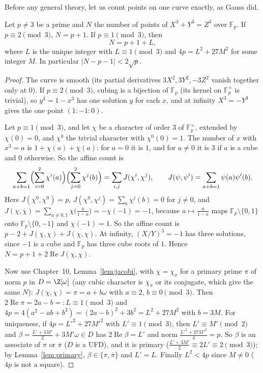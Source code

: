 Before any general theory, let us count points on one curve exactly, as Gauss did.

\begin{proposition}[Gauss]\label{prop:gausscubic}
Let $p\ne3$ be a prime and $N$ the number of points of $X^3+Y^3=Z^3$ over $\mathbb F_p$. If $p\equiv2\pmod3$, $N=p+1$. If $p\equiv1\pmod3$, then
\[
N=p+1+L,
\]
where $L$ is the unique integer with $L\equiv1\pmod3$ and $4p=L^2+27M^2$ for some integer $M$. In particular $|N-p-1|<2\sqrt p$.
\end{proposition}
\begin{proof}
The curve is smooth (its partial derivatives $3X^2,3Y^2,-3Z^2$ vanish together only at $0$). If $p\equiv2\pmod3$, cubing is a bijection of $\mathbb F_p$
(its kernel on $\mathbb F_p^\times$ is trivial), so $y^3=1-x^3$ has one solution $y$ for each $x$, and at infinity $X^3=-Y^3$ gives the one point $(1:-1:0)$.

Let $p\equiv1\pmod3$, and let $\chi$ be a character of order $3$ of $\mathbb F_p^\times$, extended by $\chi(0)=0$, and $\chi^0$ the trivial character with
$\chi^0(0)=1$. The number of $x$ with $x^3=a$ is $1+\chi(a)+\overline\chi(a)$: for $a=0$ it is $1$, and for $a\ne0$ it is $3$ if $a$ is a cube and $0$ otherwise.
So the affine count is
\[
\sum_{a+b=1}\Bigl(\sum_{i=0}^2\chi^i(a)\Bigr)\Bigl(\sum_{j=0}^2\chi^j(b)\Bigr)=\sum_{i,j}J(\chi^i,\chi^j),\qquad J(\psi,\psi')=\sum_{a+b=1}\psi(a)\psi'(b).
\]
Here $J(\chi^0,\chi^0)=p$, $J(\chi^0,\chi^j)=\sum_b\chi^j(b)=0$ for $j\ne0$, and $J(\chi,\overline\chi)=\sum_{a\ne0,1}\chi\bigl(\frac a{1-a}\bigr)=-\chi(-1)=-1$,
because $a\mapsto\frac a{1-a}$ maps $\mathbb F_p\setminus\{0,1\}$ onto $\mathbb F_p\setminus\{0,-1\}$ and $\chi(-1)=1$. So the affine count is
$p-2+J(\chi,\chi)+\overline{J(\chi,\chi)}$. At infinity, $(X/Y)^3=-1$ has three solutions, since $-1$ is a cube and $\mathbb F_p$ has three cube roots of $1$.
Hence $N=p+1+2\operatorname{Re}J(\chi,\chi)$.

Now use Chapter~10, Lemma~\ref{lem:jacobi}, with $\chi=\chi_\pi$ for a primary prime $\pi$ of norm $p$ in $D=\Z[\omega]$ (any cubic character is $\chi_\pi$ or its
conjugate, which give the same $N$): $J(\chi,\chi)=\pi=a+b\omega$ with $a\equiv2$, $b\equiv0\pmod3$. Then $2\operatorname{Re}\pi=2a-b=:L\equiv1\pmod3$ and
$4p=4(a^2-ab+b^2)=(2a-b)^2+3b^2=L^2+27M^2$ with $b=3M$. For uniqueness, if $4p=L'^2+27M'^2$ with $L'\equiv1\pmod 3$, then $L'\equiv M'\pmod2$ and
$\beta=\frac{L'+3M'}2+3M'\omega\in D$ has $2\operatorname{Re}\beta=L'$ and norm $\frac{L'^2+27M'^2}4=p$. So $\beta$ is an associate of $\pi$ or $\overline\pi$
($D$ is a UFD), and it is primary ($\frac{L'+3M'}2\equiv2L'\equiv2\pmod3$); by Lemma~\ref{lem:primary}, $\beta\in\{\pi,\overline\pi\}$ and $L'=L$. Finally
$L^2<4p$ since $M\ne0$ ($4p$ is not a square).
\end{proof}

